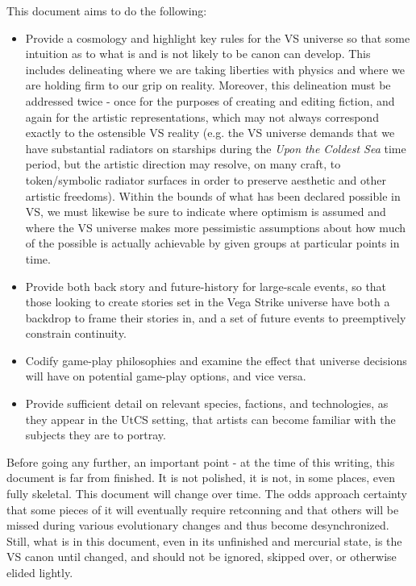 This document aims to do the following:
\begin{itemize}
\item Provide a cosmology and highlight key rules for the VS universe
   so that some intuition as to what is and is not likely to be canon
   can develop. This includes delineating where we are taking
   liberties with physics and where we are holding firm to our grip on
   reality. Moreover, this delineation must be addressed twice - once
   for the purposes of creating and editing fiction, and again for the
   artistic representations, which may not always correspond exactly
   to the ostensible VS reality (e.g. the VS universe demands that we
   have substantial radiators on starships during the {\it Upon the
   Coldest Sea} time period, but the artistic direction may resolve,
   on many craft, to token/symbolic radiator surfaces in order to preserve
   aesthetic and other artistic freedoms). Within the bounds of what
   has been declared possible in VS, we must likewise be sure to
   indicate where optimism is assumed and where the VS universe makes
   more pessimistic assumptions about how much of the possible is
   actually achievable by given groups at particular points in time.
\item Provide both back story and future-history for large-scale
  events, so that those looking to create stories set in the Vega
  Strike universe have both a backdrop to frame their stories in, and
  a set of future events to preemptively constrain continuity.
\item Codify game-play philosophies and examine the effect that universe decisions will have on potential game-play options, and vice versa.
\item Provide sufficient detail on relevant species, factions, and
  technologies, as they appear in the UtCS setting, that artists can
  become familiar with the subjects they are to portray.
\end{itemize}

Before going any further, an important point - at the time of this
writing, this document is far from finished. It is not polished, it is
not, in some places, even fully skeletal. This document will change
over time. The odds approach certainty that some pieces of it will
eventually require retconning and that others will be missed during various
evolutionary changes and thus become
desynchronized. Still, what is in this document, even in its
unfinished and mercurial state, is the VS canon until changed, and
should not be ignored, skipped over, or otherwise elided lightly.

